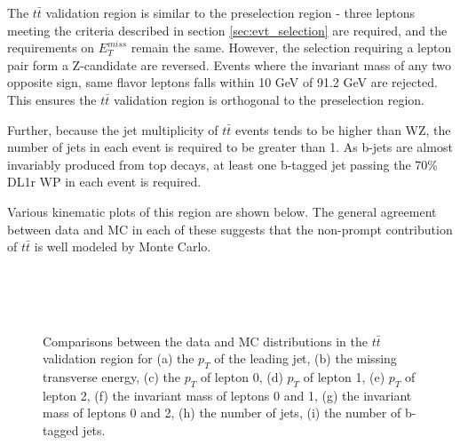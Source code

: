 The $t\bar{t}$ validation region is similar to the preselection region - three leptons meeting the criteria described in section \ref{sec:evt_selection} are required, and the requirements on $E_T^{miss}$ remain the same. However, the selection requiring a lepton pair form a Z-candidate are reversed. Events where the invariant mass of any two opposite sign, same flavor leptons falls within 10 GeV of 91.2 GeV are rejected. This ensures the $t\bar{t}$ validation region is orthogonal to the preselection region. 

Further, because the jet multiplicity of $t\bar{t}$ events tends to be higher than WZ, the number of jets in each event is required to be greater than 1. As b-jets are almost invariably produced from top decays, at least one b-tagged jet passing the 70\% DL1r WP in each event is required. 



Various kinematic plots of this region are shown below. The general agreement between data and MC in each of these suggests that the non-prompt contribution of $t\bar{t}$ is well modeled by Monte Carlo.

\begin{figure}[H]
    \centering
    \\
    \\
    \\
    \caption{Comparisons between the data and MC distributions in the $t\bar{t}$ validation region for (a) the $p_T$ of the leading jet, (b) the missing transverse energy, (c) the $p_T$ of lepton 0, (d) $p_T$ of lepton 1, (e) $p_T$ of lepton 2, (f) the invariant mass of leptons 0 and 1, (g) the invariant mass of leptons 0 and 2, (h) the number of jets, (i) the number of b-tagged jets.}
    \label{ttbar_kinematics}
\end{figure}

